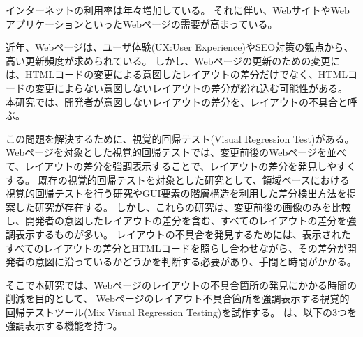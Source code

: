 インターネットの利用率は年々増加している\cite{Soumusyou}。
それに伴い、WebサイトやWebアプリケーションといったWebページの需要が高まっている。
\par
近年、Webページは、ユーザ体験(UX:User Experience)やSEO対策の観点から、高い更新頻度が求められている\cite{SEO}。
しかし、Webページの更新のための変更には、HTMLコードの変更による意図したレイアウトの差分だけでなく、HTMLコードの変更によらない意図しないレイアウトの差分が紛れ込む可能性がある。
本研究では、開発者が意図しないレイアウトの差分を、レイアウトの不具合と呼ぶ。
\par
この問題を解決するために、視覚的回帰テスト(Visual Regression Test)\cite{VisualRegressionTesting}がある。
Webページを対象とした視覚的回帰テストでは、変更前後のWebページを並べて、レイアウトの差分を強調表示することで、レイアウトの差分を発見しやすくする。
既存の視覚的回帰テストを対象とした研究として、領域ベースにおける視覚的回帰テストを行う研究\cite{RegionDetect}やGUI要素の階層構造を利用した差分検出方法を提案した研究\cite{GuiRetrExternal}が存在する。
しかし、これらの研究は、変更前後の画像のみを比較し、開発者の意図したレイアウトの差分を含む、すべてのレイアウトの差分を強調表示するものが多い。
レイアウトの不具合を発見するためには、表示されたすべてのレイアウトの差分とHTMLコードを照らし合わせながら、その差分が開発者の意図に沿っているかどうかを判断する必要があり、手間と時間がかかる。
\par
そこで本研究では、Webページのレイアウトの不具合箇所の発見にかかる時間の削減を目的として、
Webページのレイアウト不具合箇所を強調表示する視覚的回帰テストツール\toolName(Mix Visual Regression Testing)を試作する。
\toolName は、以下の3つを強調表示する機能を持つ。
